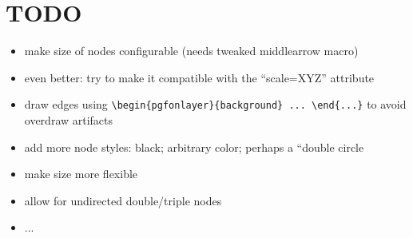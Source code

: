 \documentclass[a4paper,10pt]{scrartcl}
\begin{document}
\begin{multicols}{2}


\end{multicols}


%
%
%
\section{TODO}

\begin{itemize}
\item make size of nodes configurable (needs tweaked middlearrow macro)
\item even better: try to make it compatible with the ``scale=XYZ'' attribute
\item draw edges using \verb|\begin{pgfonlayer}{background} ... \end{...}|  to avoid overdraw artifacts
\item add more node styles: black; arbitrary color; perhaps a ``double circle
\item make size more flexible
\item allow for undirected double/triple nodes
\item ...
\end{itemize}
\end{document}

